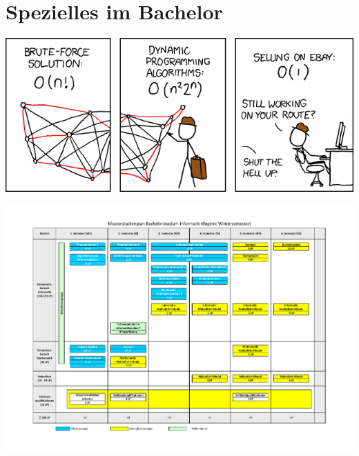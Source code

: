 \documentclass[]{papertex}
\begin{document}
	\section{Spezielles im Bachelor}
		\label{bachelor}
		\newpage
		\begin{multicols}{2}
		\end{multicols}
		\begin{center}
		\includegraphics[totalheight=6cm]{bilder/XKCD/travelling_salesman}
		\end{center}
		\begin{minipage}{1.0\linewidth}
			\begin{center}     
			\label{musterstudienplan}
			\includegraphics[angle=90, totalheight=\textheight, width=\textwidth ]{bilder/studienplan_bsc_ws/Musterstudienplan_BScInformatik_WS}
			\end{center}  
		\end{minipage}
		\newpage
\end{document}
